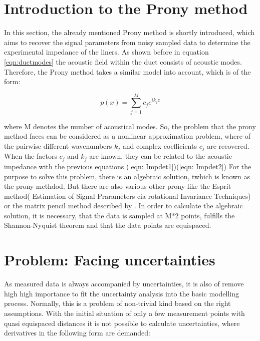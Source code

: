 \documentclass[11pt]{report} %
\begin{document}
\section{Introduction to the Prony method}

In this section, the already mentioned Prony method is shortly introduced, which aims to recover the signal parameters from noisy sampled data to determine the experimental impedance of the liners.
As shown before in equation \eqref{eqn:ductmodes} the acoustic field within the duct consists of acoustic modes. 
Therefore, the Prony method takes a similar model into account, which is of the form: 

\begin{equation}\label{eqn: expsum}
 p(x)=\sum\limits_{j=1}^M c_{j}e^{ik_{j}z} 
\end{equation}

where M denotes the number of acoustical modes. 
So, the problem that the prony method faces  can be considered as a nonlinear approximation problem, where of the  pairwise different wavenumbers $k_{j}$ and complex coefficients $c_{j}$ are recovered.
When the factors $c_j$ and $k_j$ are known, they can be related to the acoustic impedance with the previous equations (\ref{eqn: Impdet1})(\ref{eqn: Impdet2})
For the purpose to solve this problem, there is an algebraic solution, twhich is known as the prony methdod. But there are also various other prony like the Esprit method( Estimation of Signal Prarameters cia rotational Invariance Techniques) or the matrix pencil method described by \cite{Potts}.
In order to calculate the algebraic solution, it is necessary, that the data is sampled at M*2 points, fulfills the Shannon-Nyquist theorem and that the data points are equispaced.


\section{Problem: Facing uncertainties}
As measured data is always accompanied by uncertainties, it is also of {\color{red} remove high} high importance to fit the uncertainty analysis into the basic modelling process.
Normally, this is a problem of non-trivial kind based on the right assumptions.
With the initial situation of only a few measurement points with quasi equispaced distances it is not possible to calculate uncertainties, where derivatives in the following form are demanded:
\end{document}
